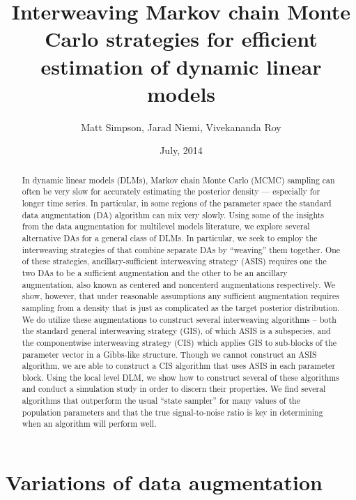 \documentclass{article}
\begin{document}
\title{Interweaving Markov chain Monte Carlo strategies for efficient
estimation of dynamic linear models}
\author{Matt Simpson, Jarad Niemi, Vivekananda Roy}
\date{July, 2014}
\maketitle

\begin{abstract}
In dynamic linear models (DLMs), Markov chain Monte Carlo (MCMC) sampling can often be very slow for accurately estimating the posterior density --- especially for longer time series. In particular, in some regions of the parameter space the standard data augmentation (DA) algorithm can mix very slowly. Using some of the insights from the data augmentation for multilevel models literature, we explore several alternative DAs for a general class of DLMs. In particular, we seek to employ the interweaving strategies of  that combine separate DAs by ``weaving'' them together. One of these strategies, ancillary-sufficient interweaving strategy (ASIS) requires one the two DAs to be a sufficient augmentation and the other to be an ancillary augmentation, also known as centered and noncenterd augmentations respectively. We show, however, that under reasonable assumptions any sufficient augmentation requires sampling from a density that is just as complicated as the target posterior distribution. We do utilize these augmentations to construct several interweaving algorithms -- both the standard general interweaving strategy (GIS), of which ASIS is a subspecies, and the componentwise interweaving strategy (CIS) which applies GIS to sub-blocks of the parameter vector in a Gibbs-like structure. Though we cannot construct an ASIS algorithm, we are able to construct a CIS algorithm that uses ASIS in each parameter block. Using the local level DLM, we show how to construct several of these algorithms and conduct a simulation study in order to discern their properties. We find several algorithms that outperform the usual ``state sampler'' for many values of the population parameters and that the true signal-to-noise ratio is key in determining when an algorithm will perform well.
\end{abstract}


\section{Variations of data augmentation}\label{sec:Intro}
\end{document}

